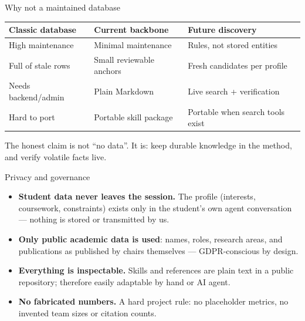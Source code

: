 \documentclass[11pt,aspectratio=169]{beamer}
\begin{document}
\begin{frame}{Why not a maintained database}
  \renewcommand{\arraystretch}{1.22}
  \small
  \begin{center}
  \begin{tabular}{@{}p{}p{}p{}@{}}
    \toprule
    \textbf{Classic database} & \textbf{Current backbone} & \textbf{Future discovery} \\
    \midrule
    High maintenance & Minimal maintenance & Rules, not stored entities \\
    Full of stale rows & Small reviewable anchors & Fresh candidates per profile \\
    Needs backend/admin & Plain Markdown & Live search + verification \\
    Hard to port & Portable skill package & Portable when search tools exist \\
    \bottomrule
  \end{tabular}
  \end{center}
  \vspace{0.8em}
  \begin{center}
    \alert{The honest claim is not ``no data''. It is: keep durable knowledge in the method, and verify volatile facts live.}
  \end{center}
\end{frame}

\begin{frame}{Privacy and governance}
  \begin{itemize}
    \item \textbf{Student data never leaves the session.} The profile
      (interests, coursework, constraints) exists only in the student's own
      agent conversation --- nothing is stored or transmitted by us.
    \item \textbf{Only public academic data is used}: names, roles, research
      areas, and publications as published by chairs themselves ---
      GDPR-conscious by design.
    \item \textbf{Everything is inspectable.} Skills and references are plain
      text in a public repository; therefore easily adaptable by hand or AI agent.
    \item \textbf{No fabricated numbers.} A hard project rule: no placeholder
      metrics, no invented team sizes or citation counts.
  \end{itemize}
\end{frame}
\end{document}
